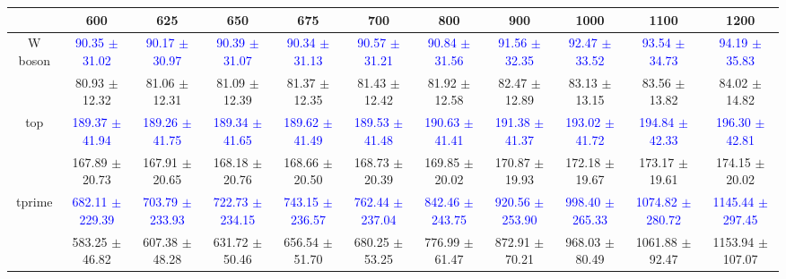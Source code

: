 {
\renewcommand{\arraystretch}{1.0}
\begin{center}
\begin{small}
\begin{tabular}{ccccccccccc}
\hline\hline
 & 600 & 625 & 650 & 675 & 700 & 800 & 900 & 1000 & 1100 & 1200 \\
\hline
\multirow{2}{*}{W boson} & \textcolor{blue}{90.35 $\pm$ 31.02} & \textcolor{blue}{90.17 $\pm$ 30.97} & \textcolor{blue}{90.39 $\pm$ 31.07} & \textcolor{blue}{90.34 $\pm$ 31.13} & \textcolor{blue}{90.57 $\pm$ 31.21} & \textcolor{blue}{90.84 $\pm$ 31.56} & \textcolor{blue}{91.56 $\pm$ 32.35} & \textcolor{blue}{92.47 $\pm$ 33.52} & \textcolor{blue}{93.54 $\pm$ 34.73} & \textcolor{blue}{94.19 $\pm$ 35.83} \\
 & \textcolor{myred}{80.93 $\pm$ 12.32} & \textcolor{myred}{81.06 $\pm$ 12.31} & \textcolor{myred}{81.09 $\pm$ 12.39} & \textcolor{myred}{81.37 $\pm$ 12.35} & \textcolor{myred}{81.43 $\pm$ 12.42} & \textcolor{myred}{81.92 $\pm$ 12.58} & \textcolor{myred}{82.47 $\pm$ 12.89} & \textcolor{myred}{83.13 $\pm$ 13.15} & \textcolor{myred}{83.56 $\pm$ 13.82} & \textcolor{myred}{84.02 $\pm$ 14.82} \\
\hline
\multirow{2}{*}{top} & \textcolor{blue}{189.37 $\pm$ 41.94} & \textcolor{blue}{189.26 $\pm$ 41.75} & \textcolor{blue}{189.34 $\pm$ 41.65} & \textcolor{blue}{189.62 $\pm$ 41.49} & \textcolor{blue}{189.53 $\pm$ 41.48} & \textcolor{blue}{190.63 $\pm$ 41.41} & \textcolor{blue}{191.38 $\pm$ 41.37} & \textcolor{blue}{193.02 $\pm$ 41.72} & \textcolor{blue}{194.84 $\pm$ 42.33} & \textcolor{blue}{196.30 $\pm$ 42.81} \\
 & \textcolor{myred}{167.89 $\pm$ 20.73} & \textcolor{myred}{167.91 $\pm$ 20.65} & \textcolor{myred}{168.18 $\pm$ 20.76} & \textcolor{myred}{168.66 $\pm$ 20.50} & \textcolor{myred}{168.73 $\pm$ 20.39} & \textcolor{myred}{169.85 $\pm$ 20.02} & \textcolor{myred}{170.87 $\pm$ 19.93} & \textcolor{myred}{172.18 $\pm$ 19.67} & \textcolor{myred}{173.17 $\pm$ 19.61} & \textcolor{myred}{174.15 $\pm$ 20.02} \\
\hline
\multirow{2}{*}{tprime} & \textcolor{blue}{682.11 $\pm$ 229.39} & \textcolor{blue}{703.79 $\pm$ 233.93} & \textcolor{blue}{722.73 $\pm$ 234.15} & \textcolor{blue}{743.15 $\pm$ 236.57} & \textcolor{blue}{762.44 $\pm$ 237.04} & \textcolor{blue}{842.46 $\pm$ 243.75} & \textcolor{blue}{920.56 $\pm$ 253.90} & \textcolor{blue}{998.40 $\pm$ 265.33} & \textcolor{blue}{1074.82 $\pm$ 280.72} & \textcolor{blue}{1145.44 $\pm$ 297.45} \\
 & \textcolor{myred}{583.25 $\pm$ 46.82} & \textcolor{myred}{607.38 $\pm$ 48.28} & \textcolor{myred}{631.72 $\pm$ 50.46} & \textcolor{myred}{656.54 $\pm$ 51.70} & \textcolor{myred}{680.25 $\pm$ 53.25} & \textcolor{myred}{776.99 $\pm$ 61.47} & \textcolor{myred}{872.91 $\pm$ 70.21} & \textcolor{myred}{968.03 $\pm$ 80.49} & \textcolor{myred}{1061.88 $\pm$ 92.47} & \textcolor{myred}{1153.94 $\pm$ 107.07} \\
\hline\hline
\end{tabular}
\end{small}
\end{center}
}

